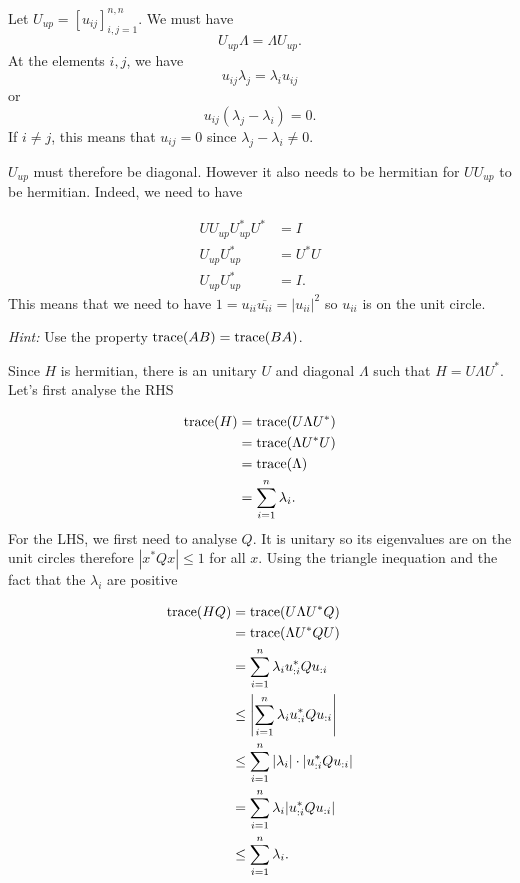 \begin{solution}
  Let $U_{up} = [u_{ij}]_{i,j=1}^{n,n}$.
  We must have
  \[ U_{up}\Lambda = \Lambda U_{up}. \]
  At the elements $i,j$, we have
  \[ u_{ij} \lambda_j = \lambda_i u_{ij} \]
  or
  \[ u_{ij} (\lambda_j - \lambda_i) = 0. \]
  If $i \neq j$, this means that $u_{ij} = 0$ since $\lambda_j - \lambda_i \neq 0$.

  $U_{up}$ must therefore be diagonal.
  However it also needs to be hermitian for $UU_{up}$ to be hermitian.
  Indeed, we need to have

  \begin{align*}
    UU_{up} U_{up}^*U^* & = I\\
    U_{up} U_{up}^* & = U^*U\\
    U_{up} U_{up}^* & = I.
  \end{align*}
  This means that we need to have $1 = u_{ii}\overline{u_{ii}} = |u_{ii}|^2$
  so $u_{ii}$ is on the unit circle.
\end{solution}

\begin{solution}
  \emph{Hint:}
  Use the property $\operatorname{trace}(AB) = \operatorname{trace}(BA)$.

  Since $H$ is hermitian, there is an unitary $U$ and diagonal $\Lambda$ such that $H = U \Lambda U^*$.
  Let's first analyse the RHS

  \begin{align*}
    \operatorname{trace}(H) & = \operatorname{trace}(U \Lambda U^*)\\
              & = \operatorname{trace}(\Lambda U^*U)\\
              & = \operatorname{trace}(\Lambda)\\
              & = \sum_{i=1}^n \lambda_i.
  \end{align*}
  For the LHS, we first need to analyse $Q$.
  It is unitary so its eigenvalues are on the unit circles therefore $|x^* Q x| \leq 1$ for all $x$.
  Using the triangle inequation and the fact that the $\lambda_i$ are positive

  \begin{align*}
    \operatorname{trace}(HQ)
    & = \operatorname{trace}(U \Lambda U^* Q)\\
    & = \operatorname{trace}(\Lambda U^* Q U)\\
    & = \sum_{i=1}^n \lambda_i u_{:i}^* Q u_{:i}\\
    & \leq \left|\sum_{i=1}^n \lambda_i u_{:i}^* Q u_{:i}\right|\\
    & \leq \sum_{i=1}^n |\lambda_i| \cdot |u_{:i}^* Q u_{:i}|\\
    & = \sum_{i=1}^n \lambda_i |u_{:i}^* Q u_{:i}|\\
    & \leq \sum_{i=1}^n \lambda_i.
  \end{align*}
\end{solution}

